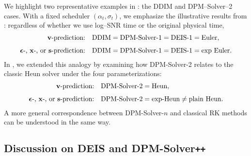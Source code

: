 We highlight two representative examples in : the DDIM and DPM–Solver–2 cases.
With a fixed scheduler $(\alpha_t,\sigma_t)$, we emphasize the illustrative results from : 
regardless of whether we use log–SNR time or the original physical time,
\[
\begin{aligned}
\text{${\mathbf{v}}$-prediction:}\quad 
&\text{DDIM} = \text{DPM-Solver-1} = \text{DEIS-1} = \text{Euler}, \\[4pt]
\text{${\bm{\epsilon}}$-, ${\mathbf{x}}$-, or ${\mathbf{s}}$-prediction:}\quad 
&\text{DDIM} = \text{DPM-Solver-1} = \text{DEIS-1} = \text{exp Euler}.
\end{aligned}
\]
In , we extended this analogy by examining how DPM-Solver-2 relates to the classic Heun solver under the four parameterizations:
\begin{align*}
\text{${\mathbf{v}}$-prediction:} 
&\quad \text{DPM-Solver-2} = \text{Heun}, \\[4pt]
\text{${\bm{\epsilon}}$-, ${\mathbf{x}}$-, or ${\mathbf{s}}$-prediction:} 
&\quad \text{DPM-Solver-2} = \text{exp-Heun} \neq \text{plain Heun}.
\end{align*}
A more general correspondence between DPM-Solver-$n$ and classical RK methods can be understood in the same way.




\subsection{Discussion on DEIS and DPM-Solver\texttt{++}}

